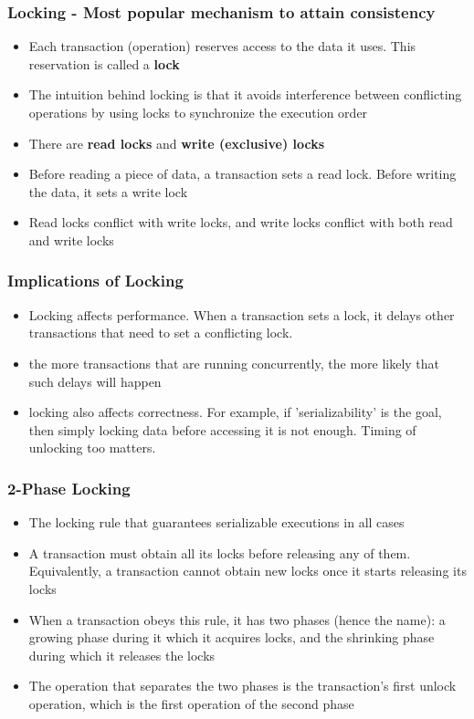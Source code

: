 \documentclass[12]{beamer}
\begin{document}
\begin{frame}
  \frametitle{Locking - Most popular mechanism to attain consistency}
  \begin{itemize}
    \item Each transaction (operation) reserves access to the data it uses. This reservation is called a \textbf{lock}
    \item The intuition behind locking is that it avoids interference between conflicting operations by using locks to synchronize the execution order
    \item There are \textbf{read locks} and \textbf{write (exclusive) locks}
    \item Before reading a piece of data, a transaction sets a read lock. Before writing the data, it sets a write lock
    \item Read locks conflict with write locks, and write locks conflict with both read and write locks
  \end{itemize}
\end{frame}

\begin{frame}
  \frametitle{Implications of Locking}
  \begin{itemize}
    \item  Locking affects performance. When a transaction sets a lock, it delays other transactions that need to set a conflicting lock.
    \item the more transactions that are running concurrently, the more likely that such delays will happen
    \item locking also affects correctness. For example, if 'serializability' is the goal, then simply locking data before accessing it is not enough. Timing of unlocking too matters.
  \end{itemize}
\end{frame}

\begin{frame}
  \frametitle{2-Phase Locking}
  \begin{itemize}
  \item The locking rule that guarantees serializable executions in all cases
  \item A transaction must obtain all its locks before releasing any of them. Equivalently, a transaction cannot obtain new locks once it starts releasing its locks
  \item When a transaction obeys this rule, it has two phases (hence the name): a growing phase during it which it acquires locks, and the shrinking phase during which it releases the locks
  \item The operation that separates the two phases is the transaction's first unlock operation, which is the first operation of the second phase
  \end{itemize}
\end{frame}
\end{document}
